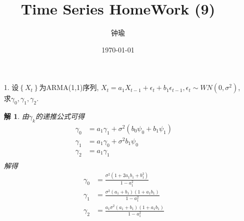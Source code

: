 \documentclass[11pt,a4paper]{ctexart}
\title{Time Series HomeWork (9)}
\author{钟瑜 \quad 222018314210044}
\date{\today}
\newtheorem*{solution}{解}
\begin{document}
\maketitle
\pagestyle{plain}%
\begin{enumerate}
	
\item[1.] 设$ \left\lbrace X_t\right\rbrace $为ARMA(1,1)序列,
$ X_t=a_1X_{t-1}+\epsilon_t+b_1\epsilon_{t-1},\epsilon_t\sim WN(0,\sigma^2)$,求$ \gamma_0,\gamma_1,\gamma_2 $.
\begin{solution}
由$ \gamma_k $的递推公式可得
\begin{equation}
\begin{aligned}
\gamma_0 &=a_1\gamma_1+\sigma^2(b_0\psi_0+b_1\psi_1)\\
\gamma_1 &=a_1\gamma_0+\sigma^2b_1\psi_0\\
\gamma_2 &=a_1\gamma_1\\
\end{aligned}
\end{equation}
解得
\begin{equation}
	\begin{aligned}
		\gamma_0 &=\frac{\sigma^2(1+2a_1b_1+b_1^2)}{1-a_1^2}\\
		\gamma_1 &=\frac{\sigma^2(a_1+b_1)(1+a_1b_1)}{1-a_1^2}\\
		\gamma_2 &=\frac{a_1\sigma^2(a_1+b_1)(1+a_1b_1)}{1-a_1^2}\\
	\end{aligned}
\end{equation}

\end{solution}

\end{enumerate}
\end{document}
